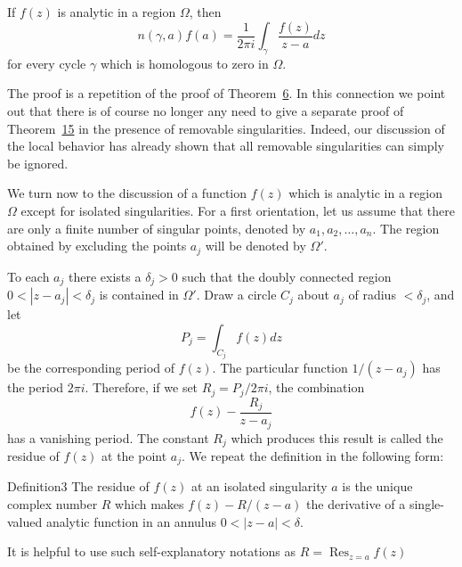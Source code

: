 \begin{originalassertion}
If $f(z)$ is analytic in a region $\Omega$, then
\begin{equation*}
n (\gamma , a) f (a) = \frac {1}{2 \pi i} \int_ {\gamma} \frac {f (z)}{z - a} d z
\end{equation*}
for every cycle $\gamma$ which is homologous to zero in $\Omega$.
\end{originalassertion}

The proof is a repetition of the proof of Theorem~\hyperref[thm:4.6]{6}. In this connection we point out that there is of course no longer any need to give a separate proof of Theorem~\hyperref[thm:4.15]{15} in the presence of removable singularities. Indeed, our discussion of the local behavior has already shown that all removable singularities can simply be ignored.

We turn now to the discussion of a function $f(z)$ which is analytic in a region $\Omega$ except for isolated singularities. For a first orientation, let us assume that there are only a finite number of singular points, denoted by $a_{1}, a_{2}, \ldots, a_{n}$. The region obtained by excluding the points $a_{j}$ will be denoted by $\Omega'$.

To each $a_j$ there exists a $\delta_j > 0$ such that the doubly connected region $0 < |z - a_j| < \delta_j$ is contained in $\Omega'$. Draw a circle $C_j$ about $a_j$ of radius $< \delta_j$, and let
\begin{equation*}
P _ {j} = \int_ {C _ {j}} f (z) d z\tag{46}\label{eq:4.46}
\end{equation*}
be the corresponding period of $f(z)$. The particular function $1/(z - a_{j})$ has the period $2\pi i$. Therefore, if we set $R_{j} = P_{j}/2\pi i$, the combination
\begin{equation*}
f (z) - \frac {R _ {j}}{z - a _ {j}}
\end{equation*}
has a vanishing period. The constant $R_{j}$ which produces this result is called the residue of $f(z)$ at the point $a_{j}$. We repeat the definition in the following form:

\begin{originalstatement}{Definition}{3}\label{def:4.3}
The residue of $f(z)$ at an isolated singularity $a$ is the unique complex number $R$ which makes $f(z) - R / (z - a)$ the derivative of a single-valued analytic function in an annulus $0 < |z - a| < \delta$.
\end{originalstatement}
It is helpful to use such self-explanatory notations as $R = \operatorname{Res}_{z=a} f(z)$


